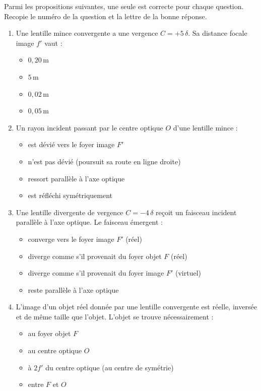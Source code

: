 \documentclass[11pt]{article}
\begin{document}
\begin{exercice}
Parmi les propositions suivantes, une seule est correcte pour chaque question. Recopie le numéro de la question et la lettre de la bonne réponse.
\begin{enumerate}
    \item Une lentille mince convergente a une vergence $C = +5\,\delta$. Sa distance focale image $f'$ vaut :
    \begin{itemize}
        \item[A)] $0,20\,\text{m}$
        \item[B)] $5\,\text{m}$
        \item[C)] $0,02\,\text{m}$
        \item[D)] $0,05\,\text{m}$
    \end{itemize}
    \item Un rayon incident passant par le centre optique $O$ d'une lentille mince :
    \begin{itemize}
        \item[A)] est dévié vers le foyer image $F'$
        \item[B)] n'est pas dévié (poursuit sa route en ligne droite)
        \item[C)] ressort parallèle à l'axe optique
        \item[D)] est réfléchi symétriquement
    \end{itemize}
    \item Une lentille divergente de vergence $C = -4\,\delta$ reçoit un faisceau incident parallèle à l'axe optique. Le faisceau émergent :
    \begin{itemize}
        \item[A)] converge vers le foyer image $F'$ (réel)
        \item[B)] diverge comme s'il provenait du foyer objet $F$ (réel)
        \item[C)] diverge comme s'il provenait du foyer image $F'$ (virtuel)
        \item[D)] reste parallèle à l'axe optique
    \end{itemize}
    \item L'image d'un objet réel donnée par une lentille convergente est réelle, inversée et de même taille que l'objet. L'objet se trouve nécessairement :
    \begin{itemize}
        \item[A)] au foyer objet $F$
        \item[B)] au centre optique $O$
        \item[C)] à $2f'$ du centre optique (au centre de symétrie)
        \item[D)] entre $F$ et $O$
    \end{itemize}
\end{enumerate}
\end{exercice}
\end{document}
